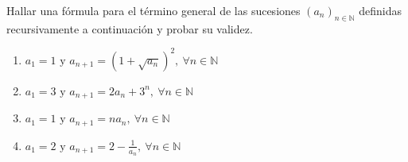\begin{enunciado}{\ejercicio}
    Hallar una fórmula para el término general de las sucesiones $(a_n)_{n \in \mathbb{N}}$ definidas recursivamente a 
    continuación y probar su validez.
    \begin{multicols}{2}
        \begin{enumerate}[label=\roman*)]
            \item $a_1 = 1 \text{ y } a_{n+1} = (1 +\sqrt{a_n})^2,\ \forall n \in \mathbb{N}$
            \item $a_1 = 3 \text{ y } a_{n+1} = 2a_n + 3^n,\ \forall n \in \mathbb{N}$
            \item $a_1 = 1 \text{ y } a_{n+1} = na_n,\ \forall n \in \mathbb{N}$
            \item $a_1 = 2 \text{ y } a_{n+1} = 2 - \displaystyle \frac{1}{a_n},\ \forall n \in \mathbb{N}$
        \end{enumerate}
\end{multicols}
\end{enunciado}

